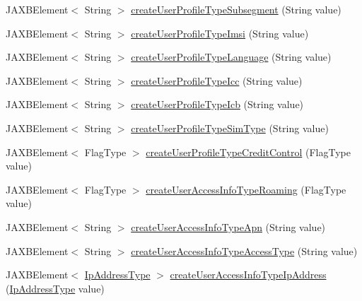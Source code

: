 \begin{DoxyCompactItemize}
JAXBElement$<$ String $>$ \hyperlink{classcom_1_1telefonica_1_1schemas_1_1unica_1_1rest_1_1directory_1_1v1_1_1ObjectFactory_a06e6a9604e6a4074691874535828fe60}{createUserProfileTypeSubsegment} (String value)
\item 
JAXBElement$<$ String $>$ \hyperlink{classcom_1_1telefonica_1_1schemas_1_1unica_1_1rest_1_1directory_1_1v1_1_1ObjectFactory_a3f4eeee69aa6693582f93306ef305fe5}{createUserProfileTypeImsi} (String value)
\item 
JAXBElement$<$ String $>$ \hyperlink{classcom_1_1telefonica_1_1schemas_1_1unica_1_1rest_1_1directory_1_1v1_1_1ObjectFactory_a34dfa3ddd9e3f260e1db4109b416b6c4}{createUserProfileTypeLanguage} (String value)
\item 
JAXBElement$<$ String $>$ \hyperlink{classcom_1_1telefonica_1_1schemas_1_1unica_1_1rest_1_1directory_1_1v1_1_1ObjectFactory_ad39b09d95497cd4dc566ef0f7bd0f076}{createUserProfileTypeIcc} (String value)
\item 
JAXBElement$<$ String $>$ \hyperlink{classcom_1_1telefonica_1_1schemas_1_1unica_1_1rest_1_1directory_1_1v1_1_1ObjectFactory_abfd61107eb491a2c4357518690469605}{createUserProfileTypeIcb} (String value)
\item 
JAXBElement$<$ String $>$ \hyperlink{classcom_1_1telefonica_1_1schemas_1_1unica_1_1rest_1_1directory_1_1v1_1_1ObjectFactory_a0da78d19ee55d0419d43d4a27358e46e}{createUserProfileTypeSimType} (String value)
\item 
JAXBElement$<$ FlagType $>$ \hyperlink{classcom_1_1telefonica_1_1schemas_1_1unica_1_1rest_1_1directory_1_1v1_1_1ObjectFactory_a4d8546f255df36fe598c7e350266e74f}{createUserProfileTypeCreditControl} (FlagType value)
\item 
JAXBElement$<$ FlagType $>$ \hyperlink{classcom_1_1telefonica_1_1schemas_1_1unica_1_1rest_1_1directory_1_1v1_1_1ObjectFactory_a789712c5eeea1cc2e8264f85fef929b0}{createUserAccessInfoTypeRoaming} (FlagType value)
\item 
JAXBElement$<$ String $>$ \hyperlink{classcom_1_1telefonica_1_1schemas_1_1unica_1_1rest_1_1directory_1_1v1_1_1ObjectFactory_a3d1aa9d5715fe809b3adcaab7e01757e}{createUserAccessInfoTypeApn} (String value)
\item 
JAXBElement$<$ String $>$ \hyperlink{classcom_1_1telefonica_1_1schemas_1_1unica_1_1rest_1_1directory_1_1v1_1_1ObjectFactory_a35b5242f37104043e5f7c341a9a841e3}{createUserAccessInfoTypeAccessType} (String value)
\item 
JAXBElement$<$ \hyperlink{classcom_1_1telefonica_1_1schemas_1_1unica_1_1rest_1_1common_1_1v1_1_1IpAddressType}{IpAddressType} $>$ \hyperlink{classcom_1_1telefonica_1_1schemas_1_1unica_1_1rest_1_1directory_1_1v1_1_1ObjectFactory_a2da682855e09806d3ee975d05f4a12c7}{createUserAccessInfoTypeIpAddress} (\hyperlink{classcom_1_1telefonica_1_1schemas_1_1unica_1_1rest_1_1common_1_1v1_1_1IpAddressType}{IpAddressType} value)

\end{DoxyCompactItemize}
